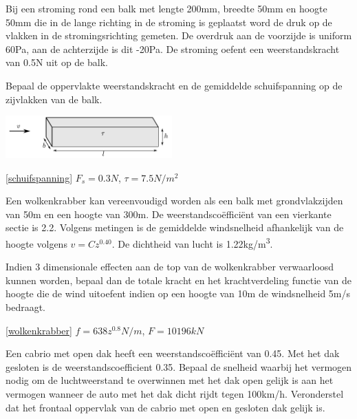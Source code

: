 \begin{toepassing}
	\label{schuifspanning}
Bij een stroming rond een balk met lengte 200mm, breedte 50mm en hoogte 50mm die in de lange richting in de stroming is geplaatst word de druk op de vlakken in de stromingsrichting gemeten. De overdruk aan de voorzijde is uniform 60Pa, aan de achterzijde is dit -20Pa. De stroming oefent een weerstandskracht van 0.5N uit op de balk.

Bepaal de oppervlakte weerstandskracht en de gemiddelde schuifspanning op de zijvlakken van de balk.

	\centering
	\includegraphics[width=0.48\textwidth]{fig/uitwendige_stroming/schuifspanning.pdf}
\end{toepassing}
\begin{antwoord}{\ref{schuifspanning}}
	$F_s = 0.3N$, $\tau = 7.5N/m^2$
\end{antwoord}
\begin{toepassing}[*]
	\label{wolkenkrabber}
Een wolkenkrabber kan vereenvoudigd worden als een balk met grondvlakzijden van 50m en een hoogte van 300m. De weerstandscoëfficiënt van een vierkante sectie is 2.2. Volgens metingen is de gemiddelde windsnelheid afhankelijk van de hoogte volgens $v = C z^{0.40}$. De dichtheid van lucht is 1.22\unit{kg/m^3}.

Indien 3 dimensionale effecten aan de top van de wolkenkrabber verwaarloosd kunnen worden, bepaal dan de totale kracht en het krachtverdeling functie van de hoogte die de wind uitoefent indien op een hoogte van 10m de windsnelheid 5m/s bedraagt.
\end{toepassing}
\begin{antwoord}{\ref{wolkenkrabber}}
	$f = 638 z^{0.8} \unit{N/m}$, $F = 10196\unit{kN}$
\end{antwoord}
\begin{toepassing}
	\label{cabrio}
Een cabrio met open dak heeft een weerstandscoëfficiënt van 0.45. Met het dak gesloten is de weerstandscoefficient 0.35.
Bepaal de snelheid waarbij het vermogen nodig om de luchtweerstand te overwinnen met het dak open gelijk is aan het vermogen wanneer de auto met het dak dicht rijdt tegen 100\unit{km/h}. Veronderstel dat het frontaal oppervlak van de cabrio met open en gesloten dak gelijk is.
\end{toepassing}
